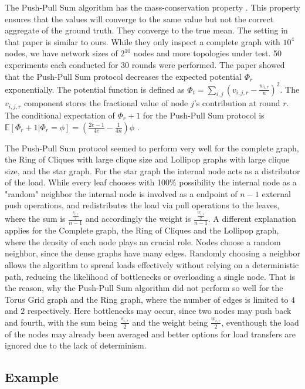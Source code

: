 

The Push-Pull Sum algorithm has the mass-conservation property \cite{nugroho2023PushPullSumDataAg}. This property ensures that the values will converge to the same value but not the correct aggregate of the ground truth. They converge to the true mean. The setting in that paper is similar to ours. While they only inspect a complete graph with $10^{4}$ nodes, we have network sizes of $2^{10}$ nodes and more topologies under test. 50 experiments each conducted for 30 rounds were performed. The paper showed that the Push-Pull Sum protocol decreases the expected potential $\Phi_r$ exponentially. The potential function is defined as $\Phi_t=\sum_{i,j}\left(v_{i,j,r}-\frac{w_{i,r}}{n}\right)^{2}$. The $v_{i,j,r}$ component stores the fractional value of node $j$'s contribution at round $r$. The conditional expectation of $\Phi_r+1$ for the Push-Pull Sum protocol is $\mathbb{E}[\Phi_r+1|\Phi_r=\phi]=(\frac{2e-1}{4e}-\frac{1}{4n})\phi$ \cite{nugroho2023PushPullSumDataAg}.

The Push-Pull Sum protocol seemed to perform very well for the complete graph, the Ring of Cliques with large clique size and Lollipop graphs with large clique size, and the star graph. For the star graph the internal node acts as a distributor of the load. While every leaf chooses with 100\% possibility the internal node as a "random" neighbor the internal node is involved as a endpoint of $n-1$ external push operations, and redistributes the load via pull operations to the leaves, where the sum is $\frac{\frac{s_{i,r}}{2}}{n-1}$ and accordingly the weight is $\frac{\frac{w_{i,r}}{2}}{n-1}$. A different explanation applies for the Complete graph, the Ring of Cliques and the Lollipop graph, where the density of each node plays an crucial role. Nodes choose a random neighbor, since the dense graphs have many edges. Randomly choosing a neighbor allows the algorithm to spread loads effectively without relying on a deterministic path, reducing the likelihood of bottlenecks or overloading a single node. That is the reason, why the Push-Pull Sum algorithm did not perform so well for the Torus Grid graph and the Ring graph, where the number of edges is limited to $4$ and $2$ respectively. Here bottlenecks may occur, since two nodes may push back and fourth, with the sum being $\frac{s_{i,r}}{2}$ and the weight being $\frac{w_{i,r}}{2}$, eventhough the load of the nodes may already been averaged and better options for load transfers are ignored due to the lack of determinism.
\subsection{Example}\label{subsec:examplePPS}

